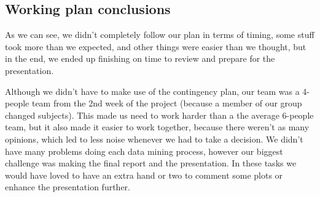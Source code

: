 



 




\pagebreak
\subsection{Working plan conclusions}
As we can see, we didn't completely follow our plan in terms of timing, some stuff took more than we expected, and other things were easier than we thought, but in the end, we ended up finishing on time to review and prepare for the presentation.

Although we didn't have to make use of the contingency plan, our team was a 4-people team from the 2nd week of the project (because a member of our group changed subjects). This made us need to work harder than a the average 6-people team, but it also made it easier to work together, because there weren't as many opinions, which led to less noise whenever we had to take a decision. We didn't have many problems doing each data mining process, however our biggest challenge was making the final report and the presentation. In these tasks we would have loved to have an extra hand or two to comment some plots or enhance the presentation further.

